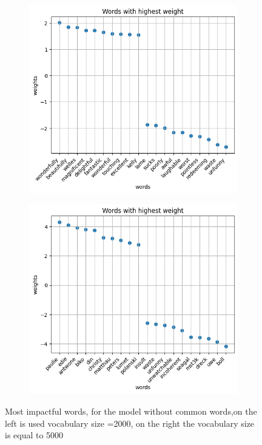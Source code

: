 \documentclass[eng]{class}
\begin{document}
\begin{figure}[h]
  \begin{subfigure}{.5\linewidth}
    \includegraphics[width=.8\columnwidth]{images/words.png}
  \end{subfigure}%
  \begin{subfigure}{.5\linewidth}
    \includegraphics[width=.8\columnwidth]{images/words5000.png}
  \end{subfigure}
  \caption{Most impactful words, for the model without common words,on the left is used vocabulary size =2000, on the right the vocabulary size is equal to 5000}
  \label{fig-2}
\end{figure}
\end{document}
